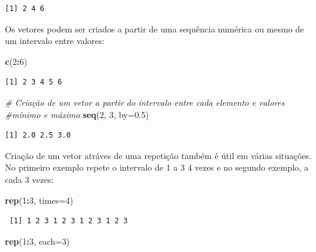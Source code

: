 \documentclass[12pt,brazil,oneside]{book}
\newenvironment{Shaded}{\begin{snugshade}}{\end{snugshade}}
\newcommand{\CommentTok}[1]{\textcolor[rgb]{0.56,0.35,0.01}{\textit{#1}}}
\newcommand{\DataTypeTok}[1]{\textcolor[rgb]{0.13,0.29,0.53}{#1}}
\newcommand{\DecValTok}[1]{\textcolor[rgb]{0.00,0.00,0.81}{#1}}
\newcommand{\FloatTok}[1]{\textcolor[rgb]{0.00,0.00,0.81}{#1}}
\newcommand{\KeywordTok}[1]{\textcolor[rgb]{0.13,0.29,0.53}{\textbf{#1}}}
\newcommand{\NormalTok}[1]{#1}
\newcommand{\OperatorTok}[1]{\textcolor[rgb]{0.81,0.36,0.00}{\textbf{#1}}}
\begin{document}
\begin{verbatim}
[1] 2 4 6
\end{verbatim}

Os vetores podem ser criados a partir de uma sequência numérica ou mesmo de um intervalo entre valores:

\begin{Shaded}
\begin{Highlighting}[]
\KeywordTok{c}\NormalTok{(}\DecValTok{2}\OperatorTok{:}\DecValTok{6}\NormalTok{)}
\end{Highlighting}
\end{Shaded}

\begin{verbatim}
[1] 2 3 4 5 6
\end{verbatim}

\begin{Shaded}
\begin{Highlighting}[]
\CommentTok{# Criação de um vetor a partir do intervalo entre cada elemento e valores}
\CommentTok{#mínimo e máximo}
\KeywordTok{seq}\NormalTok{(}\DecValTok{2}\NormalTok{, }\DecValTok{3}\NormalTok{, }\DataTypeTok{by=}\FloatTok{0.5}\NormalTok{)}
\end{Highlighting}
\end{Shaded}

\begin{verbatim}
[1] 2.0 2.5 3.0
\end{verbatim}

Criação de um vetor atráves de uma repetição também é útil em várias situações. No primeiro exemplo repete o intervalo de 1 a 3 4 vezes e no segundo exemplo, a cada 3 vezes:

\begin{Shaded}
\begin{Highlighting}[]
\KeywordTok{rep}\NormalTok{(}\DecValTok{1}\OperatorTok{:}\DecValTok{3}\NormalTok{, }\DataTypeTok{times=}\DecValTok{4}\NormalTok{)}
\end{Highlighting}
\end{Shaded}

\begin{verbatim}
 [1] 1 2 3 1 2 3 1 2 3 1 2 3
\end{verbatim}

\begin{Shaded}
\begin{Highlighting}[]
\KeywordTok{rep}\NormalTok{(}\DecValTok{1}\OperatorTok{:}\DecValTok{3}\NormalTok{, }\DataTypeTok{each=}\DecValTok{3}\NormalTok{)}
\end{Highlighting}
\end{Shaded}
\end{document}
